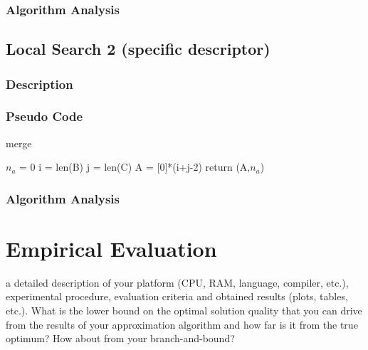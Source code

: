 \documentclass[acmlarge]{acmart}
\begin{document}
\subsubsection{Algorithm Analysis}

\lipsum[1]

\subsection{Local Search 2 (specific descriptor)}

\subsubsection{Description}

\lipsum[1]

\subsubsection{Pseudo Code}

\begin{algorithm}[H]
	\caption{merge}
	\SetAlgoLined
	$n_a$ = 0\;
	i = len(B)\;
	j = len(C)\;
	A = [0]*(i+j-2)\;
	return (A,$n_a$)
\end{algorithm}

\subsubsection{Algorithm Analysis}

\lipsum[1]

\section{Empirical Evaluation}

a detailed description of your platform (CPU, RAM, language, compiler, etc.),
experimental procedure, evaluation criteria and obtained results (plots, tables, etc.). What is the
lower bound on the optimal solution quality that you can drive from the results of your approximation
algorithm and how far is it from the true optimum? How about from your branch-and-bound?
\end{document}
